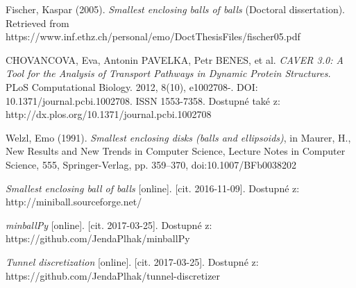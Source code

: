 \begin{thebibliography}{10}

Fischer, Kaspar (2005).
\textit{Smallest enclosing balls of balls} (Doctoral dissertation).
Retrieved from https://www.inf.ethz.ch/personal/emo/DoctThesisFiles/fischer05.pdf

CHOVANCOVA, Eva, Antonin PAVELKA, Petr BENES, et al.
\textit{CAVER 3.0: A Tool for the Analysis of Transport Pathways in Dynamic Protein Structures.}
PLoS Computational Biology. 2012, 8(10), e1002708-. DOI: 10.1371/journal.pcbi.1002708. ISSN 1553-7358. Dostupné také z: http://dx.plos.org/10.1371/journal.pcbi.1002708


Welzl, Emo (1991). \textit{Smallest enclosing disks (balls and ellipsoids)},
in Maurer, H., New Results and New Trends in Computer Science, Lecture Notes in Computer Science,
555, Springer-Verlag, pp. 359–370, doi:10.1007/BFb0038202

\textit{Smallest enclosing ball of balls} [online]. [cit. 2016-11-09]. Dostupné z: http://miniball.sourceforge.net/

\textit{minballPy} [online]. [cit. 2017-03-25]. Dostupné z: https://github.com/JendaPlhak/minballPy

\textit{Tunnel discretization} [online]. [cit. 2017-03-25]. Dostupné z: https://github.com/JendaPlhak/tunnel-discretizer


\end{thebibliography}

\cleardoublepage
